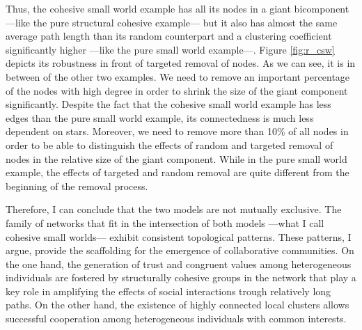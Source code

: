 Thus, the cohesive small world example has all its nodes in a giant bicomponent ---like the pure structural cohesive example--- but it also has almost the same average path length than its random counterpart and a clustering coefficient significantly higher ---like the pure small world example---. Figure \ref{fig:r_csw} depicts its robustness in front of targeted removal of nodes. As we can see, it is in between of the other two examples. We need to remove an important percentage of the nodes with high degree in order to shrink the size of the giant component significantly. Despite the fact that the cohesive small world example has less edges than the pure small world example, its connectedness is much less dependent on stars. Moreover, we need to remove more than 10\% of all nodes in order to be able to distinguish the effects of random and targeted removal of nodes in the relative size of the giant component. While in the pure small world example, the effects of targeted and random removal are quite different from the beginning of the removal process.

Therefore, I can conclude that the two models are not mutually exclusive. The family of networks that fit in the intersection of both models ---what I call cohesive small worlds--- exhibit consistent topological patterns. These patterns, I argue, provide the scaffolding for the emergence of collaborative communities. On the one hand, the generation of trust and congruent values among heterogeneous individuals are fostered by structurally cohesive groups in the network that play a key role in amplifying the effects of social interactions trough relatively long paths. On the other hand, the existence of highly connected local clusters allows successful cooperation among heterogeneous individuals with common interests.

